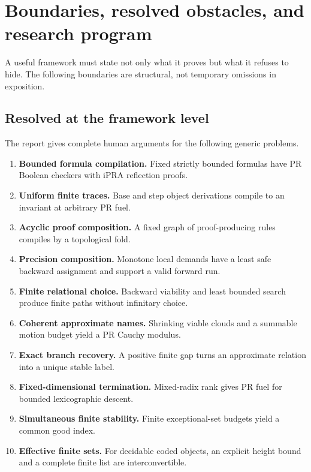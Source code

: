 \section{Boundaries, resolved obstacles, and research program}
\label{sec:boundaries}

A useful framework must state not only what it proves but what it refuses to
hide.  The following boundaries are structural, not temporary omissions in
exposition.

\subsection{Resolved at the framework level}

The report gives complete human arguments for the following generic problems.

\begin{enumerate}
\item \textbf{Bounded formula compilation.}  Fixed strictly bounded formulas
have PR Boolean checkers with iPRA reflection proofs.
\item \textbf{Uniform finite traces.}  Base and step object derivations compile
to an invariant at arbitrary PR fuel.
\item \textbf{Acyclic proof composition.}  A fixed graph of proof-producing
rules compiles by a topological fold.
\item \textbf{Precision composition.}  Monotone local demands have a least
safe backward assignment and support a valid forward run.
\item \textbf{Finite relational choice.}  Backward viability and least bounded
search produce finite paths without infinitary choice.
\item \textbf{Coherent approximate names.}  Shrinking viable clouds and a
summable motion budget yield a PR Cauchy modulus.
\item \textbf{Exact branch recovery.}  A positive finite gap turns an
approximate relation into a unique stable label.
\item \textbf{Fixed-dimensional termination.}  Mixed-radix rank gives PR fuel
for bounded lexicographic descent.
\item \textbf{Simultaneous finite stability.}  Finite exceptional-set budgets
yield a common good index.
\item \textbf{Effective finite sets.}  For decidable coded objects, an explicit
height bound and a complete finite list are interconvertible.
\end{enumerate}

